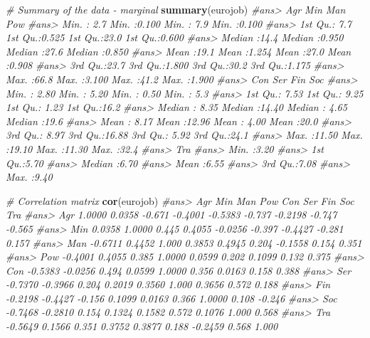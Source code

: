 \documentclass[]{book}
\newenvironment{Shaded}{\begin{snugshade}}{\end{snugshade}}
\newcommand{\KeywordTok}[1]{\textcolor[rgb]{0.13,0.29,0.53}{\textbf{#1}}}
\newcommand{\CommentTok}[1]{\textcolor[rgb]{0.56,0.35,0.01}{\textit{#1}}}
\newcommand{\NormalTok}[1]{#1}
\theoremstyle{definition}
\theoremstyle{definition}
\theoremstyle{definition}
\theoremstyle{remark}
\begin{document}
\begin{Shaded}
\begin{Highlighting}[]
\CommentTok{# Summary of the data - marginal}
\KeywordTok{summary}\NormalTok{(eurojob)}
\CommentTok{#ans>       Agr            Min             Man            Pow       }
\CommentTok{#ans>  Min.   : 2.7   Min.   :0.100   Min.   : 7.9   Min.   :0.100  }
\CommentTok{#ans>  1st Qu.: 7.7   1st Qu.:0.525   1st Qu.:23.0   1st Qu.:0.600  }
\CommentTok{#ans>  Median :14.4   Median :0.950   Median :27.6   Median :0.850  }
\CommentTok{#ans>  Mean   :19.1   Mean   :1.254   Mean   :27.0   Mean   :0.908  }
\CommentTok{#ans>  3rd Qu.:23.7   3rd Qu.:1.800   3rd Qu.:30.2   3rd Qu.:1.175  }
\CommentTok{#ans>  Max.   :66.8   Max.   :3.100   Max.   :41.2   Max.   :1.900  }
\CommentTok{#ans>       Con             Ser             Fin             Soc      }
\CommentTok{#ans>  Min.   : 2.80   Min.   : 5.20   Min.   : 0.50   Min.   : 5.3  }
\CommentTok{#ans>  1st Qu.: 7.53   1st Qu.: 9.25   1st Qu.: 1.23   1st Qu.:16.2  }
\CommentTok{#ans>  Median : 8.35   Median :14.40   Median : 4.65   Median :19.6  }
\CommentTok{#ans>  Mean   : 8.17   Mean   :12.96   Mean   : 4.00   Mean   :20.0  }
\CommentTok{#ans>  3rd Qu.: 8.97   3rd Qu.:16.88   3rd Qu.: 5.92   3rd Qu.:24.1  }
\CommentTok{#ans>  Max.   :11.50   Max.   :19.10   Max.   :11.30   Max.   :32.4  }
\CommentTok{#ans>       Tra      }
\CommentTok{#ans>  Min.   :3.20  }
\CommentTok{#ans>  1st Qu.:5.70  }
\CommentTok{#ans>  Median :6.70  }
\CommentTok{#ans>  Mean   :6.55  }
\CommentTok{#ans>  3rd Qu.:7.08  }
\CommentTok{#ans>  Max.   :9.40}

\CommentTok{# Correlation matrix}
\KeywordTok{cor}\NormalTok{(eurojob)}
\CommentTok{#ans>         Agr     Min    Man     Pow     Con    Ser     Fin    Soc    Tra}
\CommentTok{#ans> Agr  1.0000  0.0358 -0.671 -0.4001 -0.5383 -0.737 -0.2198 -0.747 -0.565}
\CommentTok{#ans> Min  0.0358  1.0000  0.445  0.4055 -0.0256 -0.397 -0.4427 -0.281  0.157}
\CommentTok{#ans> Man -0.6711  0.4452  1.000  0.3853  0.4945  0.204 -0.1558  0.154  0.351}
\CommentTok{#ans> Pow -0.4001  0.4055  0.385  1.0000  0.0599  0.202  0.1099  0.132  0.375}
\CommentTok{#ans> Con -0.5383 -0.0256  0.494  0.0599  1.0000  0.356  0.0163  0.158  0.388}
\CommentTok{#ans> Ser -0.7370 -0.3966  0.204  0.2019  0.3560  1.000  0.3656  0.572  0.188}
\CommentTok{#ans> Fin -0.2198 -0.4427 -0.156  0.1099  0.0163  0.366  1.0000  0.108 -0.246}
\CommentTok{#ans> Soc -0.7468 -0.2810  0.154  0.1324  0.1582  0.572  0.1076  1.000  0.568}
\CommentTok{#ans> Tra -0.5649  0.1566  0.351  0.3752  0.3877  0.188 -0.2459  0.568  1.000}


\end{Highlighting}
\end{Shaded}
\end{document}
